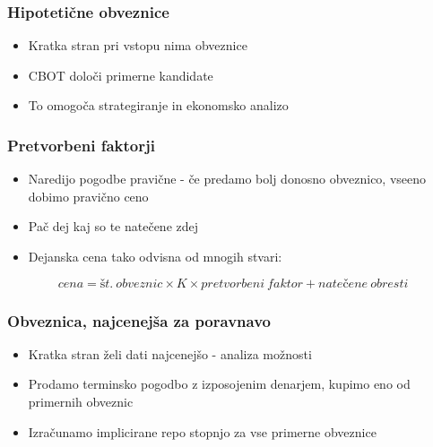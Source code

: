 \documentclass[14pt]{beamer}
\begin{document}
\begin{frame}
    \frametitle{Hipotetične obveznice}
    
    \begin{itemize}
        \item Kratka stran pri vstopu nima obveznice
        \item CBOT določi primerne kandidate
        \item To omogoča strategiranje in ekonomsko analizo
    \end{itemize}


\end{frame}


\begin{frame}
    \frametitle{Pretvorbeni faktorji}
    
    \begin{itemize}
        \item Naredijo pogodbe pravične - če predamo bolj donosno
                obveznico, vseeno dobimo pravično ceno
        \item Pač dej kaj so te natečene zdej
        \item Dejanska cena tako odvisna od mnogih stvari:
    \end{itemize}
    $$ cena = št.\:obveznic \times K \times pretvorbeni\:faktor + natečene\:obresti $$


\end{frame}


\begin{frame}
    \frametitle{Obveznica, najcenejša za poravnavo}
    
    \begin{itemize}
        \item Kratka stran želi dati najcenejšo - analiza možnosti
        \item Prodamo terminsko pogodbo z izposojenim denarjem, 
                kupimo eno od primernih obveznic
        \item Izračunamo implicirane repo stopnjo za vse primerne obveznice
    \end{itemize}


\end{frame}
\end{document}

